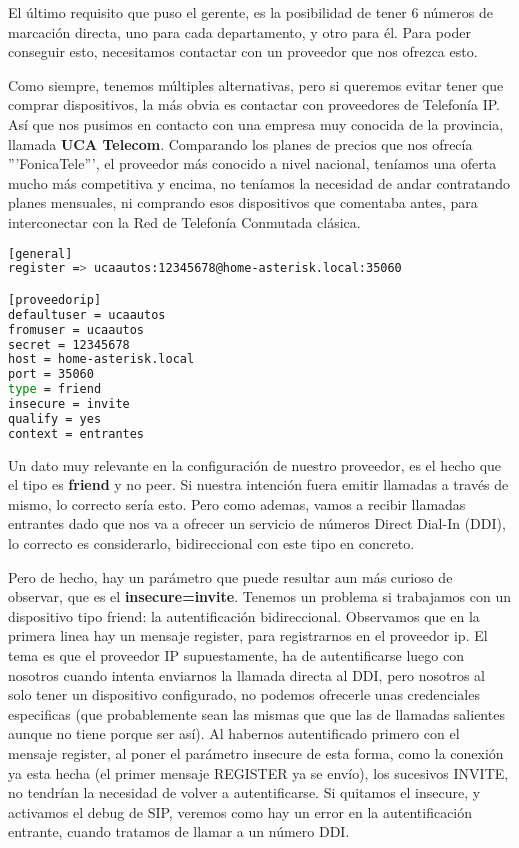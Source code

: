 El último requisito que puso el gerente, es la posibilidad de tener 6 números de marcación directa, uno para cada departamento, y otro para él. Para poder conseguir esto, necesitamos contactar con un proveedor que nos ofrezca esto.

Como siempre, tenemos múltiples alternativas, pero si queremos evitar tener que comprar dispositivos, la más obvia es contactar con proveedores de Telefonía IP. Así que nos pusimos en contacto con una empresa muy conocida de la provincia, llamada \textbf{UCA Telecom}. Comparando los planes de precios que nos ofrecía '''FonicaTele''', el proveedor más conocido a nivel nacional, teníamos una oferta mucho más competitiva y encima, no teníamos la necesidad de andar contratando planes mensuales, ni comprando esos dispositivos que comentaba antes, para interconectar con la Red de Telefonía Conmutada clásica.

\begin{lstlisting}[language=bash,title={/etc/asterisk/sip.conf}]
[general]
register => ucaautos:12345678@home-asterisk.local:35060

[proveedorip]
defaultuser = ucaautos
fromuser = ucaautos
secret = 12345678
host = home-asterisk.local
port = 35060
type = friend
insecure = invite
qualify = yes
context = entrantes
\end{lstlisting}

Un dato muy relevante en la configuración de nuestro proveedor, es el hecho que el tipo es \textbf{friend} y no peer. Si nuestra intención fuera emitir llamadas a través de mismo, lo correcto sería esto. Pero como ademas, vamos a recibir llamadas entrantes dado que nos va a ofrecer un servicio de números Direct Dial-In (DDI), lo correcto es considerarlo, bidireccional con este tipo en concreto.

Pero de hecho, hay un parámetro que puede resultar aun más curioso de observar, que es el \textbf{insecure=invite}. Tenemos un problema si trabajamos con un dispositivo tipo friend: la autentificación bidireccional. Observamos que en la primera linea hay un mensaje register, para registrarnos en el proveedor ip. El tema es que el proveedor IP supuestamente, ha de autentificarse luego con nosotros cuando intenta enviarnos la llamada directa al DDI, pero nosotros al solo tener un dispositivo configurado, no podemos ofrecerle unas credenciales especificas (que probablemente sean las mismas que que las de llamadas salientes aunque no tiene porque ser así). Al habernos autentificado primero con el mensaje register, al poner el parámetro insecure de esta forma, como la conexión ya esta hecha (el primer mensaje REGISTER ya se envío), los sucesivos INVITE, no tendrían la necesidad de volver a autentificarse. Si quitamos el insecure, y activamos el debug de SIP, veremos como hay un error en la autentificación entrante, cuando tratamos de llamar a un número DDI.

